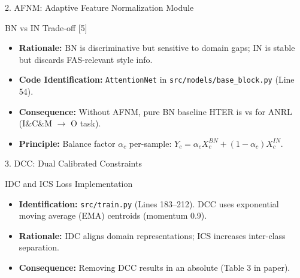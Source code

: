 \begin{frame}{2. AFNM: Adaptive Feature Normalization Module}
    \begin{block}{BN vs IN Trade-off [5]}
        \begin{itemize}
            \item \textbf{Rationale:} BN is discriminative but sensitive to domain gaps; IN is stable but discards FAS-relevant style info.
            \item \textbf{Code Identification:} \texttt{AttentionNet} in \texttt{src/models/base\_block.py} (Line 54).
            \item \textbf{Consequence:} Without AFNM, pure BN baseline HTER is  vs  for ANRL (I\&C\&M $\to$ O task).
        \end{itemize}
    \end{block}
    \vfill
    \begin{itemize}
        \item \textbf{Principle:} Balance factor $\alpha_c$ per-sample: $Y_c = \alpha_c X_c^{BN} + (1-\alpha_c) X_c^{IN}$.
    \end{itemize}
\end{frame}

\begin{frame}{3. DCC: Dual Calibrated Constraints}
    \begin{block}{IDC and ICS Loss Implementation}
        \begin{itemize}
            \item \textbf{Identification:} \texttt{src/train.py} (Lines 183--212). DCC uses exponential moving average (EMA) centroids (momentum 0.9).
            \item \textbf{Rationale:} IDC aligns domain representations; ICS increases inter-class separation.
            \item \textbf{Consequence:} Removing DCC results in an absolute  (Table 3 in paper).
        \end{itemize}
    \end{block}
\end{frame}

